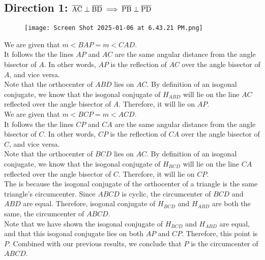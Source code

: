 \documentclass[11pt, letterpaper]{article}
\begin{document}
\begin{solution}{4}

\subsection*{Direction 1: $\overline{\rm{AC}} \perp \overline{\rm{BD}} \implies \overline{\rm{PB}} \perp \overline{\rm{PD}}$}

\begin{figure}
    \centering
    \texttt{[image: Screen Shot 2025-01-06 at 6.43.21 PM.png]}
\end{figure}

We are given that $m<BAP = m<CAD$. \\

It follows the the lines $AP$ and $AC$ are the same angular distance from the angle bisector of $A$. In other words, $AP$ is the reflection of $AC$ over the angle bisector of $A$, and vice versa.\\

Note that the orthocenter of $ABD$ lies on $AC$. By definition of an isogonal conjugate, we know that the isogonal conjugate of $H_{ABD}$ will lie on the line $AC$ reflected over the angle bisector of $A$. Therefore, it will lie on $AP$. \\

We are given that $m<BCP = m<ACD$. \\

It follows the the lines $CP$ and $CA$ are the same angular distance from the angle bisector of $C$. In other words, $CP$ is the reflection of $CA$ over the angle bisector of $C$, and vice versa.\\

Note that the orthocenter of $BCD$ lies on $AC$. By definition of an isogonal conjugate, we know that the isogonal conjugate of $H_{BCD}$ will lie on the line $CA$ reflected over the angle bisector of $C$. Therefore, it will lie on $CP$. \\

The is because the isogonal conjugate of the orthocenter of a triangle is the same triangle's circumcenter. Since $ABCD$ is cyclic, the circumcenter of $BCD$ and $ABD$ are equal. Therefore, isogonal conjugate of $H_{BCD}$ and $H_{ABD}$ are both the same, the circumcenter of $ABCD$. \\

Note that we have shown the isogonal conjugate of $H_{BCD}$ and $H_{ABD}$ are equal, and that this isogonal conjugate lies on both $AP$ and $CP$. Therefore, this point is $P$. Combined with our previous results, we conclude that $P$ is the circumcenter of $ABCD$. \\


\end{solution}
\end{document}
